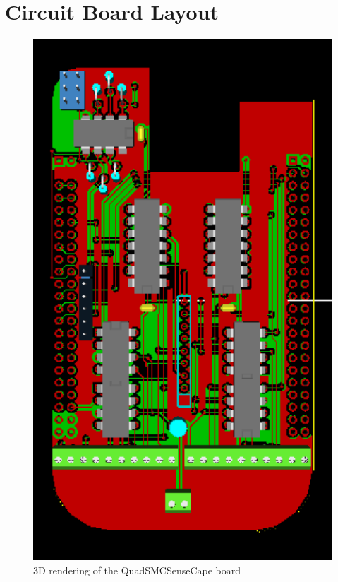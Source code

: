 \section{Circuit Board Layout}

\begin{figure}[hbpt]\begin{centering}%
\includegraphics[width=5in]{QuadSMCSenseCape3DTop.png}
\caption{3D rendering of the QuadSMCSenseCape board}
\end{centering}\end{figure}
